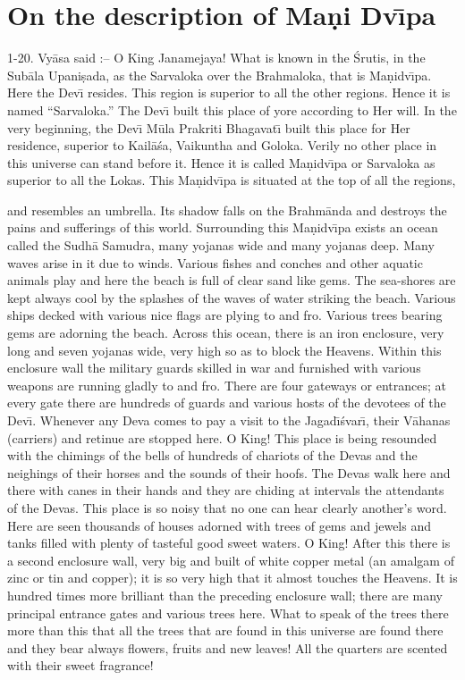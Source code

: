 \chapter{On the description of Ma\d{n}i Dv\={\i}pa}

1-20. Vy\=asa said :-- O King Janamejaya! What is known in the \'Srutis, in the Sub\=ala Upani\d{s}ada, as the Sarvaloka over the Brahmaloka, that is Ma\d{n}idv\={\i}pa. Here the Dev\={\i} resides. This region is superior to all the other regions. Hence it is named ``Sarvaloka.'' The Dev\={\i} built this place of yore according to Her will. In the very beginning, the Dev\={\i} M\=ula Prakriti Bhagavat\={\i} built this place for Her residence, superior to Kail\=a\'sa, Vaikuntha and Goloka. Verily no other place in this universe can stand before it. Hence it is called Ma\d{n}idv\={\i}pa or Sarvaloka as superior to all the Lokas. This Ma\d{n}idv\={\i}pa is situated at the top of all the regions,

and resembles an umbrella. Its shadow falls on the Brahm\=anda and destroys the pains and sufferings of this world. Surrounding this Ma\d{n}idv\={\i}pa exists an ocean called the Sudh\=a Samudra, many yojanas wide and many yojanas deep. Many waves arise in it due to winds. Various fishes and conches and other aquatic animals play and here the beach is full of clear sand like gems. The sea-shores are kept always cool by the splashes of the waves of water striking the beach. Various ships decked with various nice flags are plying to and fro. Various trees bearing gems are adorning the beach. Across this ocean, there is an iron enclosure, very long and seven yojanas wide, very high so as to block the Heavens. Within this enclosure wall the military guards skilled in war and furnished with various weapons are running gladly to and fro. There are four gateways or entrances; at every gate there are hundreds of guards and various hosts of the devotees of the Dev\={\i}. Whenever any Deva comes to pay a visit to the Jagad\={\i}\'svar\={\i}, their V\=ahanas (carriers) and retinue are stopped here. O King! This place is being resounded with the chimings of the bells of hundreds of chariots of the Devas and the neighings of their horses and the sounds of their hoofs. The Devas walk here and there with canes in their hands and they are chiding at intervals the attendants of the Devas. This place is so noisy that no one can hear clearly another's word. Here are seen thousands of houses adorned with trees of gems and jewels and tanks filled with plenty of tasteful good sweet waters. O King! After this there is a second enclosure wall, very big and built of white copper metal (an amalgam of zinc or tin and copper); it is so very high that it almost touches the Heavens. It is hundred times more brilliant than the preceding enclosure wall; there are many principal entrance gates and various trees here. What to speak of the trees there more than this that all the trees that are found in this universe are found there and they bear always flowers, fruits and new leaves! All the quarters are scented with their sweet fragrance!

